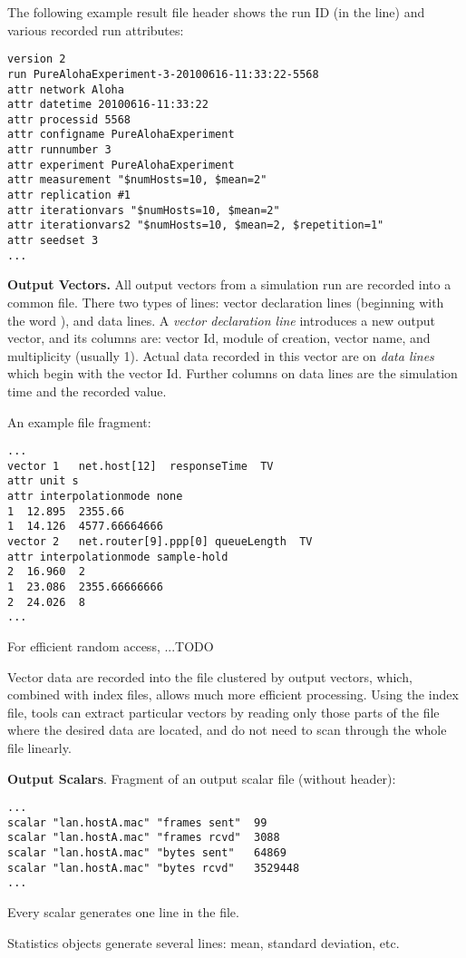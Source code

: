 The following example result file header shows the run ID (in the 
line) and various recorded run attributes:

\begin{verbatim}
version 2
run PureAlohaExperiment-3-20100616-11:33:22-5568
attr network Aloha
attr datetime 20100616-11:33:22
attr processid 5568
attr configname PureAlohaExperiment
attr runnumber 3
attr experiment PureAlohaExperiment
attr measurement "$numHosts=10, $mean=2"
attr replication #1
attr iterationvars "$numHosts=10, $mean=2"
attr iterationvars2 "$numHosts=10, $mean=2, $repetition=1"
attr seedset 3
...
\end{verbatim}


\textbf{Output Vectors.}
All output vectors from a simulation run are recorded into a common file.
There two types of lines: vector declaration lines (beginning with the word
), and data lines. A \textit{vector declaration line}
introduces a new output vector, and its columns are: vector Id, module of
creation, vector name, and multiplicity (usually 1).
Actual data recorded in this vector are on \textit{data lines} which begin
with the vector Id. Further columns on data lines are the simulation time
and the recorded value.

An example file fragment:

\begin{verbatim}
...
vector 1   net.host[12]  responseTime  TV
attr unit s
attr interpolationmode none
1  12.895  2355.66
1  14.126  4577.66664666
vector 2   net.router[9].ppp[0] queueLength  TV
attr interpolationmode sample-hold
2  16.960  2
1  23.086  2355.66666666
2  24.026  8
...
\end{verbatim}

For efficient random access, ...TODO

Vector data are recorded into the file clustered by
output vectors, which, combined with index files, allows much more
efficient processing. Using the index file, tools can extract particular
vectors by reading only those parts of the file where the desired data are
located, and do not need to scan through the whole file linearly.


\textbf{Output Scalars}.
Fragment of an output scalar file (without header):

\begin{verbatim}
...
scalar "lan.hostA.mac" "frames sent"  99
scalar "lan.hostA.mac" "frames rcvd"  3088
scalar "lan.hostA.mac" "bytes sent"   64869
scalar "lan.hostA.mac" "bytes rcvd"   3529448
...
\end{verbatim}

Every scalar generates one  line in the file.

Statistics objects generate several lines: mean, standard deviation, etc.


